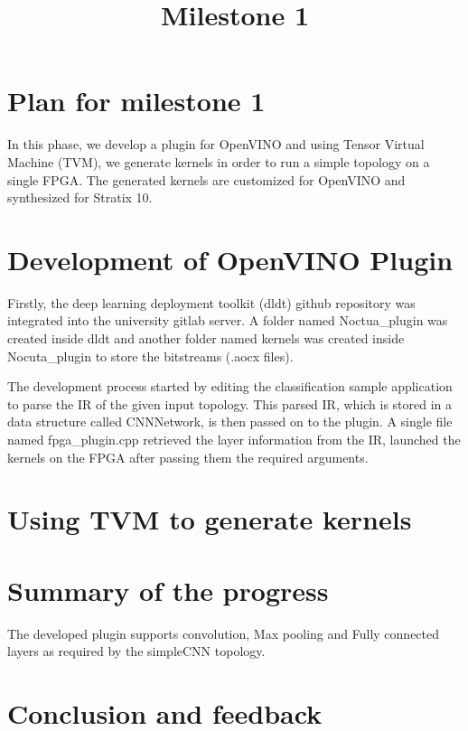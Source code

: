 \documentclass[titlepage]{report}
\title{\textbf{Milestone 1}}
\begin{document}
\maketitle

\tableofcontents{}
\newpage

\chapter{Plan for milestone 1}
In this phase, we develop a plugin for OpenVINO and using Tensor Virtual Machine (TVM), we generate kernels in order to run a simple topology on a single FPGA. The generated kernels are customized for OpenVINO and synthesized for Stratix 10.
\chapter{Development of OpenVINO Plugin}
Firstly, the deep learning deployment toolkit (dldt) github repository was integrated into the university gitlab server. A folder named Noctua\_plugin was created inside dldt and another folder named kernels was created inside Nocuta\_plugin to store the bitstreams (.aocx files).\par
The development process started by editing the classification sample application to parse the IR of the given input topology. This parsed IR, which is stored in a data structure called CNNNetwork, is then passed on to the plugin. A single file named fpga\_plugin.cpp retrieved the layer information from the IR, launched the kernels on the FPGA after passing them the required arguments.


\chapter{Using TVM to generate kernels}


\chapter{Summary of the progress}
The developed plugin supports convolution, Max pooling and Fully connected layers as required by the simpleCNN topology.


\chapter{Conclusion and feedback}
\end{document}
